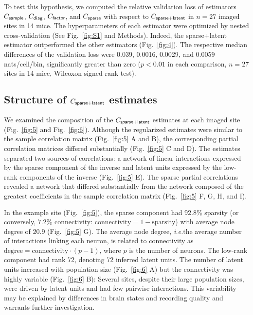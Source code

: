

To test this hypothesis, we computed the relative validation loss of estimators  $C_{\sf sample}$, $C_{\sf diag}$, $C_{\sf factor}$, and $C_{\sf sparse}$ with respect to $C_{\sf sparse+latent}$ in $n=27$ imaged sites in 14 mice.  The hyperparameters of each estimator were optimized by nested cross-validation (See Fig.~\ref{fig:S1} and  Methods). Indeed, the sparse+latent estimator outperformed the other estimators (Fig.~\ref{fig:4}). The respective median differences of the validation loss were 0.039, 0.0016, 0.0029, and 0.0059 nats/cell/bin, significantly greater than zero ($p<0.01$ in each comparison, $n=27$ sites in 14 mice, Wilcoxon signed rank test).

\subsection*{Structure of $C_{\sf sparse+latent}$ estimates}




We examined the composition of the $C_{\sf sparse+latent}$ estimates at each imaged site (Fig.~\ref{fig:5} and Fig.~\ref{fig:6}). Although the regularized estimates were similar to the sample correlation matrix (Fig.~\ref{fig:5} A and B), the corresponding partial correlation matrices differed substantially (Fig.~\ref{fig:5} C and D). The estimates separated two sources of correlations: a network of linear interactions expressed by the sparse component of the inverse and latent units expressed by the low-rank components of the inverse (Fig.~\ref{fig:5} E). The sparse partial correlations revealed a network that differed substantially from the network composed of the greatest coefficients in the sample correlation matrix (Fig.~\ref{fig:5} F, G, H, and I).

In the example site (Fig.~\ref{fig:5}), the sparse component had 92.8\% sparsity (or conversely, 7.2\% connectivity: $\mbox{connectivity}=1-\mbox{sparsity}$) with average node degree of 20.9 (Fig.~\ref{fig:5} G). The average node degree, \emph{i.e.}\;the average number of interactions linking each neuron, is related to connectivity as $\mbox{degree} = \mbox{connectivity}\cdot(p-1)$, where $p$ is the number of neurons. The low-rank component had rank 72, denoting 72 inferred latent units. The number of latent units increased with population size (Fig.~\ref{fig:6} A) but the connectivity was highly variable (Fig.~\ref{fig:6} B): Several sites, despite their large population sizes, were driven by latent units and had few pairwise interactions. This variability may be explained by differences in brain states and recording quality and warrants further investigation.

